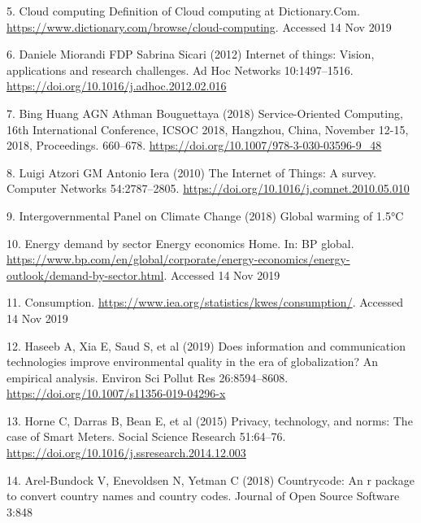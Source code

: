 \documentclass[11pt,]{article}
\begin{document}
\leavevmode\hypertarget{ref-CloudComputingDefinition}{}%
5. Cloud computing \textbar{} Definition of Cloud computing at
Dictionary.Com. \url{https://www.dictionary.com/browse/cloud-computing}.
Accessed 14 Nov 2019

\leavevmode\hypertarget{ref-danielemiorandiInternetThingsVision2012}{}%
6. Daniele Miorandi FDP Sabrina Sicari (2012) Internet of things:
Vision, applications and research challenges. Ad Hoc Networks
10:1497--1516. \url{https://doi.org/10.1016/j.adhoc.2012.02.016}

\leavevmode\hypertarget{ref-binghuangServiceOrientedComputing16th2018}{}%
7. Bing Huang AGN Athman Bouguettaya (2018) Service-Oriented Computing,
16th International Conference, ICSOC 2018, Hangzhou, China, November
12-15, 2018, Proceedings. 660--678.
\url{https://doi.org/10.1007/978-3-030-03596-9_48}

\leavevmode\hypertarget{ref-luigiatzoriInternetThingsSurvey2010}{}%
8. Luigi Atzori GM Antonio Iera (2010) The Internet of Things: A survey.
Computer Networks 54:2787--2805.
\url{https://doi.org/10.1016/j.comnet.2010.05.010}

\leavevmode\hypertarget{ref-intergovernmentalpanelonclimatechangeGlobalWarming2018}{}%
9. Intergovernmental Panel on Climate Change (2018) Global warming of
1.5°C

\leavevmode\hypertarget{ref-EnergyDemandSector}{}%
10. Energy demand by sector \textbar{} Energy economics \textbar{} Home.
In: BP global.
\url{https://www.bp.com/en/global/corporate/energy-economics/energy-outlook/demand-by-sector.html}.
Accessed 14 Nov 2019

\leavevmode\hypertarget{ref-Consumption}{}%
11. Consumption. \url{https://www.iea.org/statistics/kwes/consumption/}.
Accessed 14 Nov 2019

\leavevmode\hypertarget{ref-haseebDoesInformationCommunication2019}{}%
12. Haseeb A, Xia E, Saud S, et al (2019) Does information and
communication technologies improve environmental quality in the era of
globalization? An empirical analysis. Environ Sci Pollut Res
26:8594--8608. \url{https://doi.org/10.1007/s11356-019-04296-x}

\leavevmode\hypertarget{ref-hornePrivacyTechnologyNorms2015}{}%
13. Horne C, Darras B, Bean E, et al (2015) Privacy, technology, and
norms: The case of Smart Meters. Social Science Research 51:64--76.
\url{https://doi.org/10.1016/j.ssresearch.2014.12.003}

\leavevmode\hypertarget{ref-countrycode}{}%
14. Arel-Bundock V, Enevoldsen N, Yetman C (2018) Countrycode: An r
package to convert country names and country codes. Journal of Open
Source Software 3:848
\end{document}
